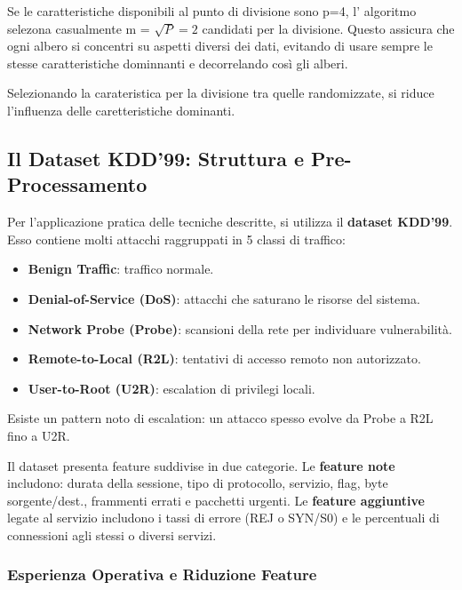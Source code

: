 Se le caratteristiche disponibili al punto di divisione sono p=4, l'
algoritmo selezona casualmente m = $\sqrt{P} = 2$ candidati per la divisione.
Questo assicura che ogni albero si concentri su aspetti diversi dei dati, 
evitando di usare sempre le stesse caratteristiche dominnanti e decorrelando
così gli alberi.

Selezionando la carateristica per la divisione tra quelle randomizzate,
si riduce l'influenza delle caretteristiche dominanti.


\subsection{Il Dataset KDD'99: Struttura e
Pre-Processamento}

Per l'applicazione pratica delle tecniche descritte, si
utilizza il \textbf{dataset KDD'99}. Esso contiene molti
attacchi raggruppati in 5 classi di traffico:

\begin{itemize}
    \item \textbf{Benign Traffic}: traffico normale.
    \item \textbf{Denial-of-Service (DoS)}: attacchi che
        saturano le risorse del sistema.
    \item \textbf{Network Probe (Probe)}: scansioni
        della rete per individuare vulnerabilità.
    \item \textbf{Remote-to-Local (R2L)}: tentativi di
        accesso remoto non autorizzato.
    \item \textbf{User-to-Root (U2R)}: escalation di
        privilegi locali.
\end{itemize}

Esiste un pattern noto di escalation: un attacco spesso
evolve da Probe a R2L fino a U2R.

Il dataset presenta feature suddivise in due categorie.
Le \textbf{feature note} includono: durata della sessione,
tipo di protocollo, servizio, flag, byte sorgente/dest.,
frammenti errati e pacchetti urgenti. Le
\textbf{feature aggiuntive} legate al servizio includono
i tassi di errore (REJ o SYN/S0) e le percentuali di
connessioni agli stessi o diversi servizi.

\subsubsection{Esperienza Operativa e Riduzione Feature}

